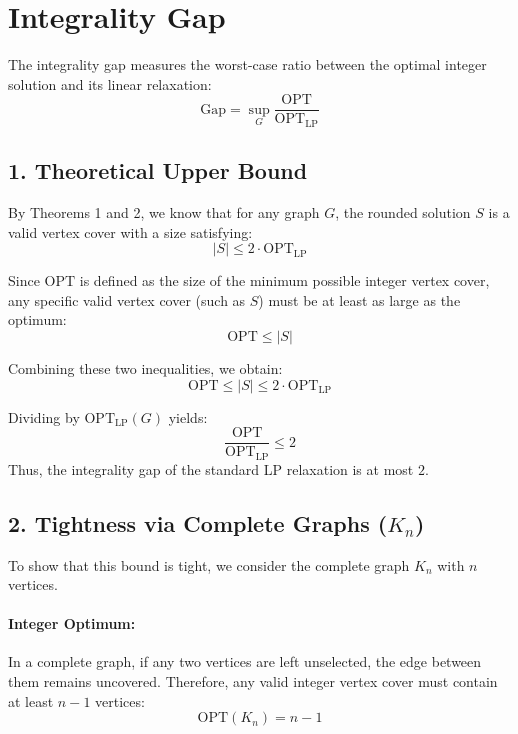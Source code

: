 \documentclass[11pt,a4paper]{article}
\begin{document}
\section{Integrality Gap}

The integrality gap measures the worst-case ratio between the optimal integer solution and its linear relaxation:
\[ \text{Gap} = \sup_G \frac{\text{OPT}}{\text{OPT}_{\text{LP}}} \]

\subsection*{1. Theoretical Upper Bound}
By Theorems 1 and 2, we know that for any graph $G$, the rounded solution $S$ is a valid vertex cover with a size satisfying:
\begin{equation}
    |S| \leq 2 \cdot \text{OPT}_{\text{LP}}
\end{equation}

Since $\text{OPT}$ is defined as the size of the minimum possible integer vertex cover, any specific valid vertex cover (such as $S$) must be at least as large as the optimum:
\begin{equation}
    \text{OPT} \leq |S|
\end{equation}

Combining these two inequalities, we obtain:
\begin{equation}
    \text{OPT} \leq |S| \leq 2 \cdot \text{OPT}_{\text{LP}}
\end{equation}

Dividing by $\text{OPT}_{\text{LP}}(G)$ yields:
\begin{equation}
    \frac{\text{OPT}}{\text{OPT}_{\text{LP}}} \leq 2
\end{equation}
Thus, the integrality gap of the standard LP relaxation is at most $2$.

\subsection*{2. Tightness via Complete Graphs ($K_n$)}
To show that this bound is tight, we consider the complete graph $K_n$ with $n$ vertices.

\paragraph{Integer Optimum:} In a complete graph, if any two vertices are left unselected, the edge between them remains uncovered. Therefore, any valid integer vertex cover must contain at least $n-1$ vertices:
\[ \text{OPT}(K_n) = n-1 \]
\end{document}
